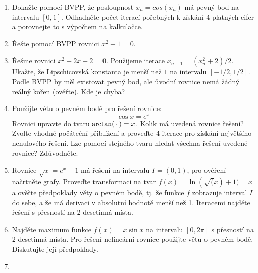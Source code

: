 \begin{enumerate}
   \item Dokažte pomocí BVPP, že posloupnost $x_n = cos(x_n)$ má pevný bod na intervalu $[0,1]$. Odhadněte počet iterací pořebných k získání 4 platných cifer a porovnejte to s 
         výpočtem na kalkulačce.
   \item Řešte pomocí BVPP rovnici $x^2-1 = 0$.
   \item Řešme rovnici $x^2-2x+2 = 0$. Použijeme iterace $x_{n+1} = (x_n^2+2)/2$. Ukažte, že Lipschicovská konstanta je menší než $1$ na intervalu $[-1/2, 1/2]$. Podle BVPP by měl existovat pevný bod, ale
     ůvodní rovnice nemá žádný reálný kořen (ověřte). Kde je chyba?
   \item Použijte větu o pevném bodě pro řešení rovnice:
  \[ \cos x = e^x\]
   Rovnici upravte do tvaru $\arctan( {\hspace{0.18em}\cdot\hspace{0.18em}}) = x$. 
   Kolik má uvedená rovnice řešení? Zvolte vhodné počáteční přiblížení a proveďte 4 iterace pro získání největšího nenulového řešení. Lze pomocí stejného tvaru hledat všechna řešení uvedené rovnice? Zdůvodněte.
  \item 
   Rovnice $\sqrt{x}=e^x-1$ má řešení na intervalu $I=(0,1)$, pro ověření načrtněte grafy. Proveďte transformaci na tvar
   $f(x)=\ln(\sqrt(x)+1)=x$ a ověřte předpoklady věty o pevném bodě, tj. že funkce $f$ zobrazuje interval $I$ do sebe,
   a že má derivaci v absolutní hodnotě menší než 1.
   Iteracemi najděte řešení s přesností na 2 desetinná místa.
   \item
   Najděte maximum funkce $f(x)=x\sin x$ na intervalu $[0,2\pi]$ s přesností na 2 desetinná místa. Pro řešení nelineární rovnice použijte větu o pevném bodě. Diskutujte její předpoklady.
   \item

\end{enumerate}





